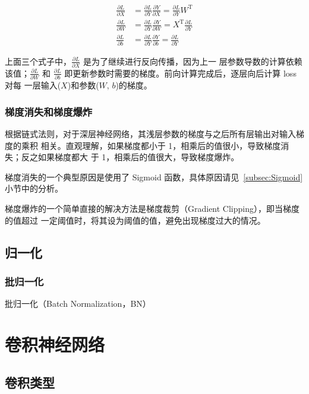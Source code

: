 \begin{align}
  \label{equ:bp-fc}
  \frac{\partial L}{\partial X} & = \frac{\partial L}{\partial Y} \frac{\partial Y}{\partial X} = \frac{\partial L}{\partial Y} W^{\mathrm{T}} \\
  \frac{\partial L}{\partial W} & = \frac{\partial L}{\partial Y} \frac{\partial Y}{\partial W} = X^{\mathrm{T}} \frac{\partial L}{\partial Y}\\
  \frac{\partial L}{\partial b} & = \frac{\partial L}{\partial Y} \frac{\partial Y}{\partial b} = \frac{\partial L}{\partial Y}
\end{align}

上面三个式子中，$\frac{\partial L}{\partial X}$ 是为了继续进行反向传播，因为上一
层参数导数的计算依赖该值；$\frac{\partial L}{\partial W}$ 和 $\frac{\partial
  L}{\partial b}$ 即更新参数时需要的梯度。前向计算完成后，逐层向后计算 loss 对每
一层输入($X$)和参数($W, \, b$)的梯度。

\subsection{梯度消失和梯度爆炸}
\label{subsec:gradient-vanish-explosion}
根据链式法则，对于深层神经网络，其浅层参数的梯度与之后所有层输出对输入梯度的乘积
相关。直观理解，如果梯度都小于 1，相乘后的值很小，导致梯度消失；反之如果梯度都大
于 1，相乘后的值很大，导致梯度爆炸。

梯度消失的一个典型原因是使用了 Sigmoid 函数，具体原因请见~\ref{subsec:Sigmoid}小节中的分析。

梯度爆炸的一个简单直接的解决方法是梯度裁剪（Gradient Clipping），即当梯度的值超过
一定阈值时，将其设为阈值的值，避免出现梯度过大的情况。

\section{归一化}

\subsection{批归一化}
\label{sub:BN}

批归一化（Batch Normalization，BN）

\chapter{卷积神经网络}

\section{卷积类型}

